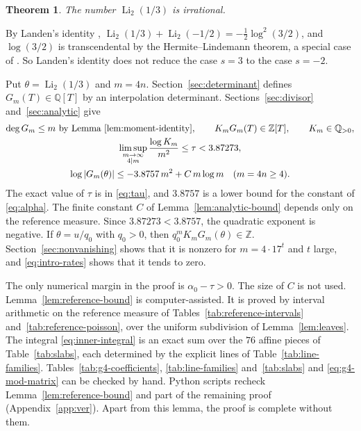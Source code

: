 \documentclass{amsart}
\newtheorem{theorem}{Theorem}
\numberwithin{equation}{section}
\numberwithin{table}{section}
\newcommand{\Li}{\operatorname{Li}}
\newcommand{\Z}{\mathbb{Z}}
\newcommand{\nslabs}{76}
\newcommand{\taubound}{3.87273}
\newcommand{\alphabound}{3.8757}
\begin{document}
\begin{theorem}\label{thm:main}
The number $\Li_2(1/3)$ is irrational.
\end{theorem}

By Landen's identity \cite[(25.12.3)]{DLMF},
$\Li_2(1/3)+\Li_2(-1/2)=-\frac12\log^2(3/2)$, and $\log(3/2)$ is
transcendental by the Hermite--Lindemann theorem, a special case of
\cite[Theorem~1.4]{Baker}. So Landen's identity does not reduce the case
$s=3$ to the case $s=-2$.

Put $\theta=\Li_2(1/3)$ and $m=4n$. Section~\ref{sec:determinant} defines
$G_m(T)\in\mathbb Q[T]$ by an interpolation determinant.
Sections~\ref{sec:divisor} and~\ref{sec:analytic} give
\begin{gather}
\deg G_m\le m\ \text{by Lemma~\ref{lem:moment-identity}},\qquad
K_mG_m(T)\in\Z[T],
\qquad K_m\in\mathbb Q_{>0},\notag
\\
\limsup_{\substack{m\to\infty\\4\mid m}}
  \frac{\log K_m}{m^2}\le\tau<\taubound,\notag\\
\log|G_m(\theta)|\le-\alphabound\,m^2+C\,m\log m
\quad(m=4n\ge4).\label{eq:intro-rates}
\end{gather}
The exact value of $\tau$ is in \eqref{eq:tau}, and $\alphabound$ is a
lower bound for the constant of \eqref{eq:alpha}. The finite constant $C$ of
Lemma~\ref{lem:analytic-bound} depends only on the reference measure.
Since $\taubound<\alphabound$, the quadratic exponent is negative.
If $\theta=u/q_0$ with $q_0>0$, then $q_0^mK_mG_m(\theta)\in\Z$.
Section~\ref{sec:nonvanishing} shows that it is nonzero for
$m=4\cdot17^t$ and $t$ large, and \eqref{eq:intro-rates} shows that it tends
to zero.

The only numerical margin in the proof is $\alpha_0-\tau>0$. The size of
$C$ is not used.
Lemma~\ref{lem:reference-bound} is computer-assisted. It is proved by
interval arithmetic on the reference measure of
Tables~\ref{tab:reference-intervals} and~\ref{tab:reference-poisson}, over
the uniform subdivision of Lemma~\ref{lem:leaves}. The integral
\eqref{eq:inner-integral} is an exact sum over the $\nslabs$ affine pieces of
Table~\ref{tab:slabs}, each determined by the explicit lines of
Table~\ref{tab:line-families}.
Tables~\ref{tab:g4-coefficients}, \ref{tab:line-families} and~\ref{tab:slabs}
and \eqref{eq:g4-mod-matrix} can be checked by hand. Python scripts recheck
Lemma~\ref{lem:reference-bound} and part of the remaining proof
(Appendix~\ref{app:ver}). Apart from this lemma, the proof is complete without them.
\end{document}
